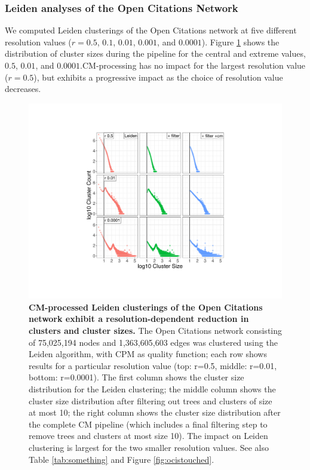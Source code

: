 \documentclass[11pt]{article}   	%
\begin{document}
\subsubsection{Leiden analyses of the Open Citations Network}
We computed Leiden clusterings of the Open Citations network at five different resolution values ($r=0.5$, $0.1$, $0.01$, $0.001$, and $0.0001$). Figure \ref{fig:oc_size_count_plots_leiden} shows the distribution of cluster sizes during the pipeline for the central and extreme values, $0.5$, $0.01$, and $0.0001$.CM-processing  has no impact for the largest resolution value ($r=0.5$), but exhibits a progressive impact as the choice of resolution value decreases.

\begin{figure}[H]
\centering
\includegraphics[width=\linewidth]{figs/fig1_kn.pdf}
\caption{\textbf{CM-processed Leiden clusterings of the Open Citations network exhibit a resolution-dependent reduction in clusters and cluster sizes.}
The Open Citations network consisting of 75,025,194 nodes and 1,363,605,603 edges was clustered using the Leiden algorithm,
with CPM as quality function; each row shows results for a particular resolution value (top: r=0.5, middle: r=0.01, bottom: r=0.0001).
The first column shows the cluster size distribution for the Leiden clustering; the middle column shows the cluster size distribution after filtering out trees and clusters of size at most 10; the right column shows the cluster size distribution after the complete CM pipeline (which includes a final filtering step to remove trees and clusters at most size 10).
The impact on Leiden clustering is largest for the two smaller resolution values.
See also   Table \ref{tab:something} and Figure \ref{fig:ocistouched}.}
\label{fig:oc_size_count_plots_leiden}
\end{figure}
\end{document}
